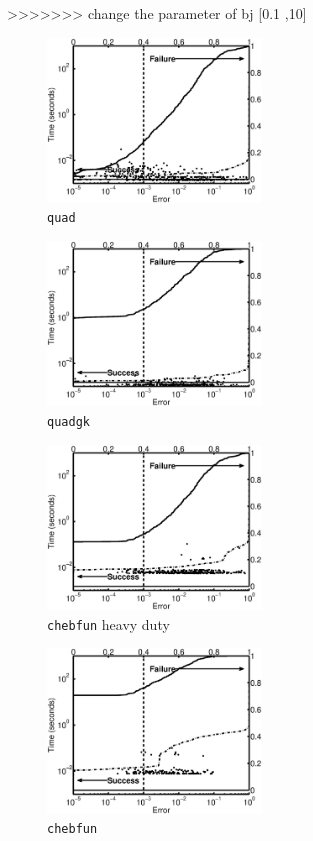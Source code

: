 \documentclass[graybox]{svmult}
\begin{document}
>>>>>>> change the parameter of bj [0.1 ,10]
\begin{figure}
\centering
\begin{minipage}{5.7cm} \centering \includegraphics[width=5.7cm]{gaussiand=1quadErrTime.eps} \\ {\tt quad} \end{minipage}
\begin{minipage}{5.7cm} \centering \includegraphics[width=5.7cm]{gaussiand=1quadgkErrTime.eps} \\ {\tt quadgk} \end{minipage}
\begin{minipage}{5.7cm} \centering \includegraphics[width=5.7cm]{gaussiand=1chebfunErrTime.eps} \\ {\tt chebfun} heavy duty \end{minipage}
\begin{minipage}{5.7cm} \centering \includegraphics[width=5.7cm]{gaussiand=1chebfunheavyErrTime.eps} \\ {\tt chebfun} \end{minipage}

\end{figure}
\end{document}
